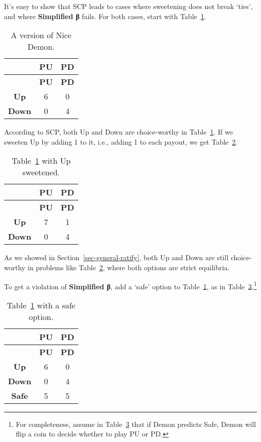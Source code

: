 \documentclass[
  11pt,
  letterpaper,
  DIV=11,
  numbers=noendperiod,
  twoside]{scrartcl}
\begin{document}
It's easy to show that SCP leads to cases where sweetening does not
break `ties', and where \textbf{Simplified β} fails. For both cases,
start with Table~\ref{tbl-nice-demon-linear}.

\begin{longtable}[]{@{}ccc@{}}
\caption{A version of Nice
Demon.}\label{tbl-nice-demon-linear}\tabularnewline
\toprule\noalign{}
& \textbf{PU} & \textbf{PD} \\
\midrule\noalign{}
\endfirsthead
\toprule\noalign{}
& \textbf{PU} & \textbf{PD} \\
\midrule\noalign{}
\endhead
\bottomrule\noalign{}
\endlastfoot
\textbf{Up} & 6 & 0 \\
\textbf{Down} & 0 & 4 \\
\end{longtable}

According to SCP, both Up and Down are choice-worthy in
Table~\ref{tbl-nice-demon-linear}. If we sweeten Up by adding 1 to it,
i.e., adding 1 to each payout, we get Table~\ref{tbl-nice-demon-plus}.

\begin{longtable}[]{@{}ccc@{}}
\caption{Table~\ref{tbl-nice-demon-linear} with Up
sweetened.}\label{tbl-nice-demon-plus}\tabularnewline
\toprule\noalign{}
& \textbf{PU} & \textbf{PD} \\
\midrule\noalign{}
\endfirsthead
\toprule\noalign{}
& \textbf{PU} & \textbf{PD} \\
\midrule\noalign{}
\endhead
\bottomrule\noalign{}
\endlastfoot
\textbf{Up} & 7 & 1 \\
\textbf{Down} & 0 & 4 \\
\end{longtable}

As we showed in Section~\ref{sec-general-ratify}, both Up and Down are
still choice-worthy in problems like Table~\ref{tbl-nice-demon-plus},
where both options are strict equilibria.

To get a violation of \textbf{Simplified β}, add a `safe' option to
Table~\ref{tbl-nice-demon-linear}, as in
Table~\ref{tbl-nice-demon-safe}.\footnote{For completeness, assume in
  Table~\ref{tbl-nice-demon-safe} that if Demon predicts Safe, Demon
  will flip a coin to decide whether to play PU or PD.}

\begin{longtable}[]{@{}ccc@{}}
\caption{Table~\ref{tbl-nice-demon-linear} with a safe
option.}\label{tbl-nice-demon-safe}\tabularnewline
\toprule\noalign{}
& \textbf{PU} & \textbf{PD} \\
\midrule\noalign{}
\endfirsthead
\toprule\noalign{}
& \textbf{PU} & \textbf{PD} \\
\midrule\noalign{}
\endhead
\bottomrule\noalign{}
\endlastfoot
\textbf{Up} & 6 & 0 \\
\textbf{Down} & 0 & 4 \\
\textbf{Safe} & 5 & 5 \\
\end{longtable}
\end{document}
